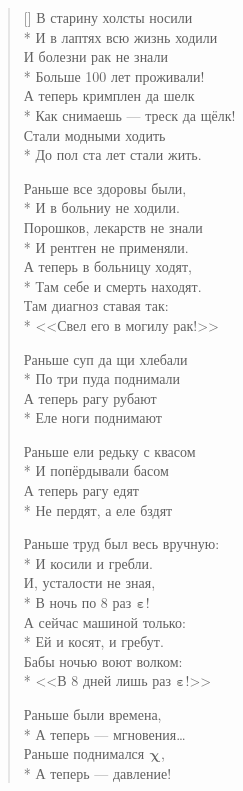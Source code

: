 \documentclass[a4paper,oneside,14pt]{scrbook}
\newcommand{\myEbt}[2]{$^{\text{#1}}${\large{$\boldsymbol{\varepsilon}$}}$_{\text{#2}}$}
\newcommand{\myXyi}[2]{$^{\text{#1}}${\large{$\boldsymbol{\chi}$}}$_{\text{#2}}$}
\begin{document}
    \settowidth{\versewidth}{И в лаптях всю жизнь ходили}
    \begin{verse}[\versewidth]
        В старину холсты носили\\*
        И в лаптях всю жизнь ходили\\
        И болезни рак не знали\\*
        Больше 100 лет проживали!\\
        \vin А теперь кримплен да шелк\\*
        \vin Как снимаешь --- треск да щёлк!\\
        \vin Стали модными ходить\\*
        \vin До пол ста лет стали жить.
        
        Раньше все здоровы были,\\*
        И в больниу не ходили.\\
        Порошков, лекарств не знали\\*
        И рентген не применяли.\\
        \vin А теперь в больницу ходят,\\*
        \vin Там себе и смерть находят.\\
        \vin Там диагноз ставая так:\\*
        \vin <<Свел его в могилу рак!>>
        
        Раньше суп да щи хлебали\\*
        По три пуда поднимали\\
        \vin А теперь рагу рубают\\*
        \vin Еле ноги поднимают
        
        Раньше ели редьку с квасом\\*
        И попёрдывали басом\\
        \vin А теперь рагу едят\\*
        \vin Не пердят, а еле бздят
        
        Раньше труд был весь вручную:\\*
        И косили и гребли.\\
        И, усталости не зная,\\*
        В ночь по 8 раз {\myEbt{}{}}!\\
        \vin А сейчас машиной только:\\*
        \vin Ей и косят, и гребут.\\
        \vin Бабы ночью воют волком:\\*
        \vin <<В 8 дней лишь раз {\myEbt{}{}}!>>
        
        Раньше были времена,\\*
        А теперь --- мгновения\ldots\\
        \vin Раньше поднимался {\myXyi{}{}},\\*
        \vin А теперь --- давление!
    \end{verse}    
\end{document}
